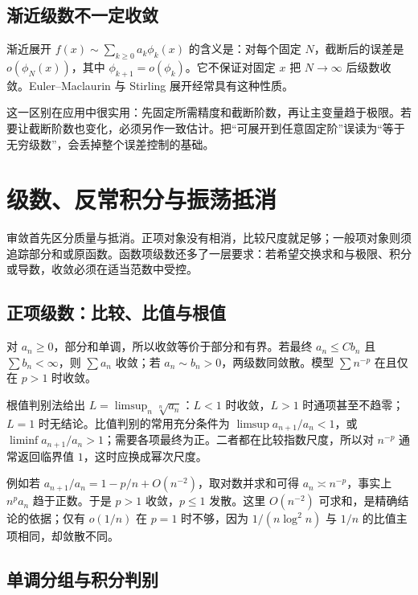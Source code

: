 \documentclass[12pt,fontset=fandol]{ctexart}
\begin{document}
\subsection{渐近级数不一定收敛}

\label{app:taylor-asymptotic-series}

渐近展开 $f(x)\sim\sum_{k\geq0}a_k\phi_k(x)$ 的含义是：对每个固定 $N$，截断后的误差是 $o(\phi_N(x))$，其中 $\phi_{k+1}=o(\phi_k)$。它不保证对固定 $x$ 把 $N\to\infty$ 后级数收敛。Euler--Maclaurin 与 Stirling 展开经常具有这种性质。

这一区别在应用中很实用：先固定所需精度和截断阶数，再让主变量趋于极限。若要让截断阶数也变化，必须另作一致估计。把“可展开到任意固定阶”误读为“等于无穷级数”，会丢掉整个误差控制的基础。



\section{级数、反常积分与振荡抵消}

审敛首先区分质量与抵消。正项对象没有相消，比较尺度就足够；一般项对象则须追踪部分和或原函数。函数项级数还多了一层要求：若希望交换求和与极限、积分或导数，收敛必须在适当范数中受控。

\subsection{正项级数：比较、比值与根值}

\label{app:series-positive}

对 $a_n\geq0$，部分和单调，所以收敛等价于部分和有界。若最终 $a_n\leq Cb_n$ 且 $\sum b_n<\infty$，则 $\sum a_n$ 收敛；若 $a_n\sim b_n>0$，两级数同敛散。模型 $\sum n^{-p}$ 在且仅在 $p>1$ 时收敛。

根值判别法给出 $L=\limsup_n\sqrt[n]{a_n}$：$L<1$ 时收敛，$L>1$ 时通项甚至不趋零；$L=1$ 时无结论。比值判别的常用充分条件为 $\limsup a_{n+1}/a_n<1$，或 $\liminf a_{n+1}/a_n>1$；需要各项最终为正。二者都在比较指数尺度，所以对 $n^{-p}$ 通常返回临界值 $1$，这时应换成幂次尺度。

例如若 $a_{n+1}/a_n=1-p/n+O(n^{-2})$，取对数并求和可得 $a_n\asymp n^{-p}$，事实上 $n^pa_n$ 趋于正数。于是 $p>1$ 收敛，$p\leq1$ 发散。这里 $O(n^{-2})$ 可求和，是精确结论的依据；仅有 $o(1/n)$ 在 $p=1$ 时不够，因为 $1/(n\log^2n)$ 与 $1/n$ 的比值主项相同，却敛散不同。

\subsection{单调分组与积分判别}
\end{document}
